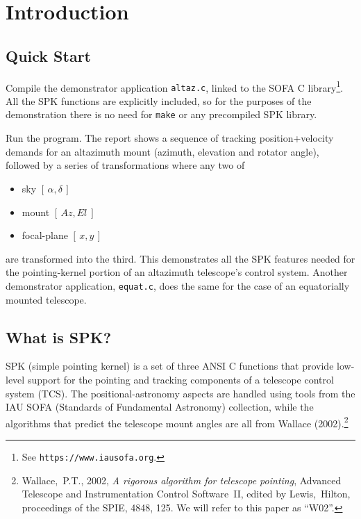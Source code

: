 \documentclass[11pt,fleqn,twoside,\paper]{article}
\renewcommand{\_}{{\tt\char'137}}     %
\newcommand{\radec}     {$[\,\alpha,\delta\,]$}
\newcommand{\azel}      {$[\,Az,El~]$}
\newcommand{\xy}        {$[\,x,y\,]$}
\begin{document}



\newenvironment{tabs}{\goodbreak\begin{tabbing}}{\end{tabbing}}
\newenvironment{cmnds}{\begin{tabs}
XXX \= XX \= XXXXXXXXXXXXXXXXXXXX \= \kill}{\end{tabs}}
\newenvironment{cmd}{\begin{tabbing}
XXXXXX \= XX \= XXXXXXXXXXXX \= \kill}{\end{tabbing}}

\cleardoublepage
{}
\section{Introduction}
\label{intro}
\subsection{Quick Start}
\label{quick}
Compile the demonstrator application {\tt altaz.c}, linked to the
SOFA C library\footnote{See {\tt https://www.iausofa.org}.}.
All the SPK functions are explicitly included, so for the purposes
of the demonstration there is no need
for {\tt make} or any precompiled SPK library.

Run the program.  The report shows a sequence of tracking
position+velocity
demands for an altazimuth mount (azimuth, elevation and rotator
angle), followed by a series of transformations where any two of
\begin{itemize}
\item sky \radec
\item mount \azel\
\item focal-plane \xy\
\end{itemize}
are transformed into the third.  This demonstrates all the SPK
features needed for the pointing-kernel portion of an altazimuth
telescope's control system.  Another demonstrator application,
{\tt equat.c}, does the same for the case of an equatorially
mounted telescope.

\subsection{What is SPK?}
\label{descr}
SPK (simple pointing kernel) is a set of three
ANSI C functions that provide low-level support for
the pointing and tracking components of a
telescope control system (TCS).  The positional-astronomy aspects are
handled using tools from the IAU SOFA
(Standards of Fundamental Astronomy)
collection, while the
algorithms that predict the telescope mount angles are all from Wallace
(2002).\footnote{Wallace,~P.T., 2002, {\it A rigorous algorithm for
telescope pointing}, Advanced Telescope and Instrumentation Control
Software~II, edited by Lewis,~Hilton, proceedings of the SPIE, 4848,
125.  We will refer to this paper as ``W02''.}
\end{document}
